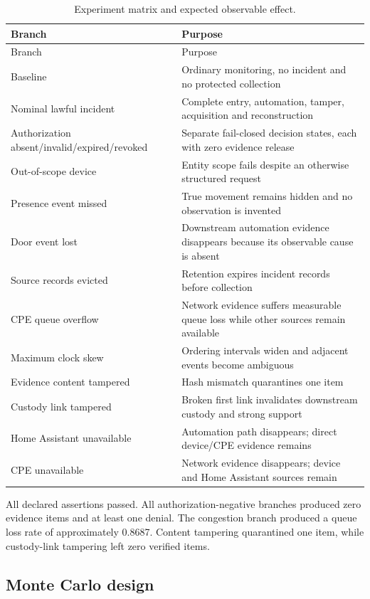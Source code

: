﻿\documentclass[11pt,a4paper]{article}
\begin{document}
\begin{longtable}{@{}p{}p{}@{}}
\caption{Experiment matrix and expected observable effect.}\label{tab:experiments}\\
\toprule
Branch & Purpose \\
\midrule
\endfirsthead
\toprule
Branch & Purpose \\
\midrule
\endhead
Baseline & Ordinary monitoring, no incident and no protected collection \\
Nominal lawful incident & Complete entry, automation, tamper, acquisition and reconstruction \\
Authorization absent/invalid/expired/revoked & Separate fail-closed decision states, each with zero evidence release \\
Out-of-scope device & Entity scope fails despite an otherwise structured request \\
Presence event missed & True movement remains hidden and no observation is invented \\
Door event lost & Downstream automation evidence disappears because its observable cause is absent \\
Source records evicted & Retention expires incident records before collection \\
CPE queue overflow & Network evidence suffers measurable queue loss while other sources remain available \\
Maximum clock skew & Ordering intervals widen and adjacent events become ambiguous \\
Evidence content tampered & Hash mismatch quarantines one item \\
Custody link tampered & Broken first link invalidates downstream custody and strong support \\
Home Assistant unavailable & Automation path disappears; direct device/CPE evidence remains \\
CPE unavailable & Network evidence disappears; device and Home Assistant sources remain \\
\bottomrule
\end{longtable}

All declared assertions passed. All authorization-negative branches produced zero evidence items and at least one denial. The congestion branch produced a queue loss rate of approximately 0.8687. Content tampering quarantined one item, while custody-link tampering left zero verified items.

\subsection{Monte Carlo design}
\end{document}
